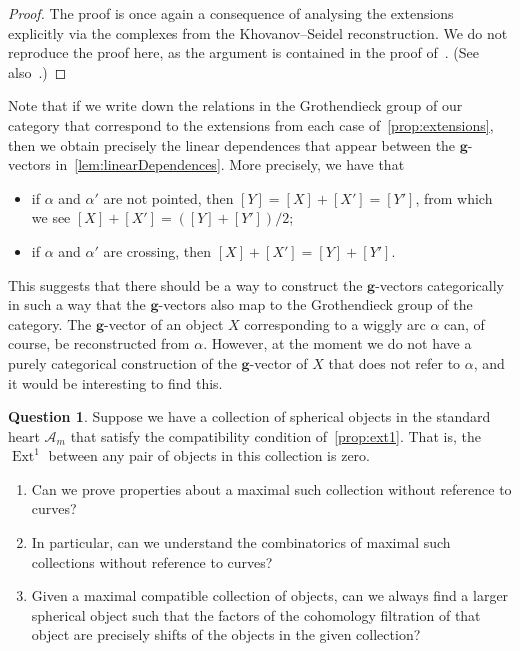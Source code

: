 \documentclass{amsart}
\theoremstyle{definition}
\newtheorem{question}[theorem]{Question}
\renewcommand{\b}[1]{{\boldsymbol{#1}}} %
\DeclareMathOperator{\Ext}{Ext} %
\begin{document}
\begin{proof}
  The proof is once again a consequence of analysing the extensions explicitly via the complexes from the Khovanov--Seidel reconstruction.
  We do not reproduce the proof here, as the argument is contained in the proof of~\cite[Thm.~5.5]{tho:06}.
  (See also~\cite[Fig.~4]{tho:06}.)
\end{proof}
Note that if we write down the relations in the Grothendieck group of our category that correspond to the extensions from each case of~\cref{prop:extensions}, then we obtain precisely the linear dependences that appear between the \(\b{g}\)-vectors in~\cref{lem:linearDependences}.
More precisely, we have that
\begin{itemize}
\item if \(\alpha\) and \(\alpha'\) are not pointed, then
  \([Y] = [X] + [X'] = [Y']\),
  from which we see \([X] + [X'] = ([Y] + [Y'])/2\);
\item if \(\alpha\) and \(\alpha'\) are crossing, then
  \([X] + [X'] = [Y] + [Y'].\)
\end{itemize}
This suggests that there should be a way to construct the \(\b{g}\)-vectors categorically in such a way that the \(\b{g}\)-vectors also map to the Grothendieck group of the category.
The \(\b{g}\)-vector of an object \(X\) corresponding to a wiggly arc \(\alpha\) can, of course, be reconstructed from \(\alpha\).
However, at the moment we do not have a purely categorical construction of the \(\b{g}\)-vector of \(X\) that does not refer to \(\alpha\), and it would be interesting to find this.

\begin{question}
  Suppose we have a collection of spherical objects in the standard heart \(\mathcal{A}_m\) that satisfy the compatibility condition of~\cref{prop:ext1}.
  That is, the \(\Ext^1\) between any pair of objects in this collection is zero.
  \begin{enumerate}
  \item Can we prove properties about a maximal such collection without reference to curves?
  \item In particular, can we understand the combinatorics of maximal such collections without reference to curves?
  \item Given a maximal compatible collection of objects, can we always find a larger spherical object such that the factors of the cohomology filtration of that object are precisely shifts of the objects in the given collection?
  \end{enumerate}
\end{question}
\end{document}
